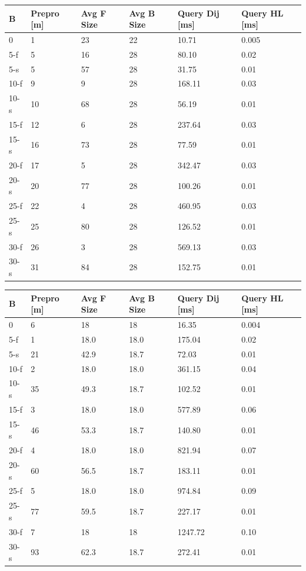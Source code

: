 \documentclass[opre,nonblindrev]{informs3} %
\begin{document}
\begin{table}[h]

\begin{adjustbox}{max width=\textwidth,keepaspectratio}
\begin{tabular}{| l | p{1cm} | p{1cm} | p{1cm} | p{1.2cm} | p{1.2cm} | }
\hline
	B & Prepro [m] & Avg F Size & Avg B Size & Query Dij [ms] & Query HL [ms] \\ \hline \hline
	0 & 1 & 23 & 22 & 10.71 & 0.005 \\ \hline
5-f  & 5  & 16 & 28 & 80.10  & 0.02 \\
5-s  & 5  & 57 & 28 & 31.75  & 0.01 \\ \hline
10-f & 9  & 9 & 28 & 168.11 & 0.03 \\
10-s & 10 & 68 & 28 & 56.19  & 0.01 \\ \hline
15-f & 12 & 6 & 28 & 237.64 & 0.03 \\
15-s & 16 & 73 & 28 & 77.59  & 0.01 \\ \hline
20-f & 17 & 5 & 28 & 342.47 & 0.03 \\
20-s & 20 & 77 & 28 & 100.26 & 0.01 \\ \hline
25-f & 22 & 4 & 28 & 460.95 & 0.03 \\
25-s & 25 & 80 & 28 & 126.52 & 0.01 \\ \hline
30-f & 26 & 3 & 28 & 569.13 & 0.03 \\
30-s & 31 & 84 & 28 & 152.75 & 0.01 \\ \hline
\end{tabular}%
\quad
\begin{tabular}{ | l | p{1cm} | p{1cm} | p{1cm} | p{1.2cm} | p{1.2cm} |}
\hline
	B & Prepro  [m] & Avg F Size & Avg B Size & Query Dij [ms] & Query HL [ms] \\ \hline \hline
	0 & 6 & 18 & 18 & 16.35 & 0.004 \\ \hline
5-f  & 1  & 18.0 & 18.0 & 175.04  & 0.02 \\
5-s  & 21 & 42.9 & 18.7 & 72.03   & 0.01 \\ \hline
10-f & 2  & 18.0 & 18.0 & 361.15  & 0.04 \\
10-s & 35 & 49.3 & 18.7 & 102.52  & 0.01 \\ \hline
15-f & 3  & 18.0 & 18.0 & 577.89  & 0.06 \\
15-s & 46 & 53.3 & 18.7 & 140.80  & 0.01 \\ \hline
20-f & 4  & 18.0 & 18.0 & 821.94  & 0.07 \\
20-s & 60 & 56.5 & 18.7 & 183.11  & 0.01 \\ \hline
25-f & 5  & 18.0 & 18.0 & 974.84  & 0.09 \\
25-s & 77 & 59.5 & 18.7 & 227.17  & 0.01 \\ \hline
30-f & 7  & 18   & 18   & 1247.72 & 0.10 \\
30-s & 93 & 62.3 & 18.7 & 272.41  & 0.01 \\ \hline
\end{tabular}%
\end{adjustbox}


\end{table}
\end{document}
